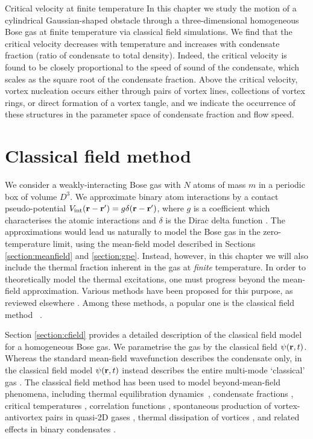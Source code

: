 \begin{chapter}{\label{cha:nonequib}Critical velocity at finite temperature}
In this chapter we study the motion of a cylindrical Gaussian-shaped
obstacle through a three-dimensional homogeneous Bose gas at finite
temperature via classical field simulations. We
find that the critical velocity decreases with temperature and
increases with condensate fraction (ratio of condensate to total density).
Indeed, the critical velocity is found to be closely proportional
to the speed of sound of the condensate, which scales as the square
root of the condensate fraction. Above
the critical velocity, vortex nucleation occurs either through
pairs of vortex lines, collections of vortex rings, or direct formation of a vortex tangle, and we indicate the occurrence of these structures in the parameter space of condensate fraction and flow speed.

  \section{Classical field method}
\label{sec:theory}

We consider a weakly-interacting Bose gas with $N$ atoms of mass $m$ in a periodic box of volume $D^3$.  We approximate binary atom interactions by a contact pseudo-potential $V_{\mathrm{int}}({\bf r}-{\bf r'})= g \delta({\bf r}-{\bf r'})$, where $g$ is a coefficient which characterises the atomic interactions and $\delta$ is the Dirac delta function \cite{Pethick}. The approximations would lead us naturally to model the Bose gas in the zero-temperature limit, using the mean-field model described in Sections \ref{section:meanfield} and \ref{section:gpe}. Instead, however, in this chapter we will also include the thermal fraction inherent in the gas at {\it finite} temperature. In order to theoretically model the thermal excitations, one must progress beyond the mean-field approximation.
Various methods have been proposed for this purpose, as reviewed elsewhere
\cite{Pol_Rev,Proukakis,griffin2009bose,finite_temp_book,Blakie,berloff_2014}.
Among these methods, a popular one is the classical field method ~\cite{Svis5,Davis,PRL.87.210404,
PhysRevA.66.013603,Davis2,PhysRevLett.95.263901,Pol_Rev}.

Section \ref{section:cfield} provides a detailed description of the classical field model for a homogeneous Bose gas. We parametrise the gas by the classical field $\psi({\bf r},t)$. Whereas the standard mean-field wavefunction describes the condensate only, in the classical field model $\psi({\bf r},t)$ instead describes the entire multi-mode `classical' gas \cite{Proukakis,Blakie}.  The classical field method has been used to model beyond-mean-field phenomena, including thermal equilibration dynamics~\cite{PhysRevA.66.013603,PhysRevLett.95.263901,pattinson_2014,nazarenko_2014}, condensate fractions \cite{Davis}, critical temperatures \cite{Davis2006}, correlation functions \cite{Wright2011}, spontaneous production of vortex-antivortex pairs in quasi-2D gases \cite{Simula}, thermal dissipation of vortices \cite{berloff_2007},  and related effects in binary condensates \cite{Berloff_2006,Salman20091482,pattinson_2014}.


\end{chapter}
